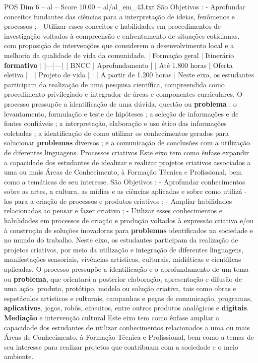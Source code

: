 \begin{textsample}{POS Dim 6 – al – Score 10.00 – al/al\_em\_43.txt}
São Objetivos : - Aprofundar conceitos fundantes das ciências para a interpretação de ideias, fenômenos e processos ; - Utilizar esses conceitos e habilidades em procedimentos de investigação voltados à compreensão e enfrentamento de situações cotidianas, com proposição de intervenções que considerem o desenvolvimento local e a melhoria da qualidade de vida da comunidade. | Formação geral | Itinerário \textbf{formativo} | |---|---| | BNCC | Aprofundamento | | Até 1.800 horas | Oferta eletiva | | | Projeto de vida | | | A partir de 1.200 horas | Neste eixo, os estudantes participam da realização de uma pesquisa científica, compreendida como procedimento privilegiado e integrador de áreas e componentes curriculares.
O processo pressupõe a identificação de uma dúvida, questão ou \textbf{problema} ; o levantamento, formulação e teste de hipóteses ; a seleção de informações e de fontes confiáveis ; a interpretação, elaboração e uso ético das informações coletadas ; a identificação de como utilizar os conhecimentos gerados para solucionar \textbf{problemas} diversos ; e a comunicação de conclusões com a utilização de diferentes linguagens.
Processos criativos Este eixo tem como ênfase expandir a capacidade dos estudantes de idealizar e realizar projetos criativos associados a uma ou mais Áreas de Conhecimento, à Formação Técnica e Profissional, bem como a temáticas de seu interesse.
São Objetivos : - Aprofundar conhecimentos sobre as artes, a cultura, as mídias e as ciências aplicadas e sobre como utilizá -los para a criação de processos e produtos criativos ; - Ampliar habilidades relacionadas ao pensar e fazer criativo ; - Utilizar esses conhecimentos e habilidades em processos de criação e produção voltados à expressão criativa e/ou à construção de soluções inovadoras para \textbf{problemas} identificados na sociedade e no mundo do trabalho.
Neste eixo, os estudantes participam da realização de projetos criativos, por meio da utilização e integração de diferentes linguagens, manifestações sensoriais, vivências artísticas, culturais, midiáticas e científicas aplicadas.
O processo pressupõe a identificação e o aprofundamento de um tema ou \textbf{problema}, que orientará a posterior elaboração, apresentação e difusão de uma ação, produto, protótipo, modelo ou solução criativa, tais como obras e espetáculos artísticos e culturais, campanhas e peças de comunicação, programas, \textbf{aplicativos}, jogos, robôs, circuitos, entre outros produtos analógicos e \textbf{digitais}. \textbf{Mediação} e intervenção cultural Este eixo tem como ênfase ampliar a capacidade dos estudantes de utilizar conhecimentos relacionados a uma ou mais Áreas de Conhecimento, à Formação Técnica e Profissional, bem como a temas de seu interesse para realizar projetos que contribuam com a sociedade e o meio ambiente.

\end{textsample}
